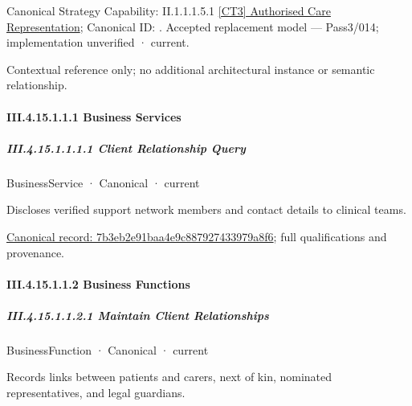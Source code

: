 {\small Canonical Strategy Capability: II.1.1.1.5.1 \hyperref[element:a7092757af934517850ff63707397050]{[CT3] Authorised Care Representation}; Canonical ID: \texttt{}. Accepted replacement model — Pass3/014; implementation unverified · current.}\par
Contextual reference only; no additional architectural instance or semantic relationship.\par
\paragraph*{III.4.15.1.1.1 Business Services}
\label{navigation:III.4.15.1.1.1}

\subparagraph*{III.4.15.1.1.1.1 Client Relationship Query}
\label{navigation:III.4.15.1.1.1.1}

\label{element:7b3eb2e91baa4e9c887927433979a8f6}
{\small BusinessService · Canonical · current}\par

Discloses verified support network members and contact details to clinical teams.


{\footnotesize \href{../../../../continuum/business/business-service/7b3eb2e91baa4e9c887927433979a8f6.md}{Canonical record: 7b3eb2e91baa4e9c887927433979a8f6}; full qualifications and provenance.}\par
\paragraph*{III.4.15.1.1.2 Business Functions}
\label{navigation:III.4.15.1.1.2}

\subparagraph*{III.4.15.1.1.2.1 Maintain Client Relationships}
\label{navigation:III.4.15.1.1.2.1}

\label{element:1b2ce4a240384672b78976904b83a011}
{\small BusinessFunction · Canonical · current}\par

Records links between patients and carers, next of kin, nominated representatives, and legal guardians.


